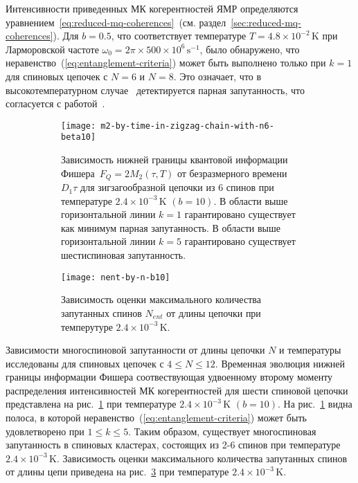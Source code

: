 Интенсивности приведенных МК когерентностей ЯМР определяются уравнением~\ref{eq:reduced-mq-coherences}~(см. раздел~\ref{sec:reduced-mq-coherences}).
Для $b=0.5$,
что соответствует температуре $T=4.8 \times 10^{-2}\,\mbox{K}$
при Ларморовской частоте $\omega_0=2\pi\times 500\times 10^6 \,\mbox{s}^{-1}$,
было обнаружено,
что неравенство~(\ref{eq:entanglement-criteria}) может быть выполнено только при $k=1$ для спиновых цепочек с $N=6$ и $N=8$.
Это означает, что в высокотемпературном случае~\cite{Doronin2019}
детектируется парная запутанность,
что согласуется с работой~\cite{Feldman2012}.

\begin{figure}[H]
  \begin{subfigure}[t]{0.49\textwidth}
    \texttt{[image: m2-by-time-in-zigzag-chain-with-n6-beta10]}
    \caption{
      Зависимость нижней границы квантовой информации
      Фишера~$F_Q=2M_2(\tau, T)$
      от безразмерного времени~$D_1\tau$
      для зигзагообразной цепочки из 6 спинов
      при температуре $2.4\times 10^{-3}\,\mbox{K}$ $(b=10)$.
      В области выше горизонтальной линии $k=1$
      гарантировано существует как минимум парная запутанность.
      В области выше горизонтальной линии $k=5$
      гарантировано существует шестиспиновая запутанность.
    }
    \label{fig:fig3}
  \end{subfigure}
  \hfill
  \begin{subfigure}[t]{0.49\textwidth}
    \texttt{[image: nent-by-n-b10]}
    \caption{
      Зависимость оценки максимального количества запутанных спинов $N_{ent}$ от длины цепочки при темперутуре $2.4\times 10^{-3}\,\mbox{K}$.
    }
    \label{fig:fig4}
  \end{subfigure}
  \caption{}
\end{figure}

Зависимости многоспиновой запутанности от длины цепочки $N$ и температуры исследованы для спиновых цепочек с $4\leqslant N \leqslant 12$.
Временная эволюция нижней границы информации Фишера соотвествующая
удвоенному второму моменту распределения интенсивностей МК когерентностей для шести спиновой цепочки представлена на рис.~\ref{fig:fig3} при температуре $2.4\times 10^{-3}\,\mbox{K}$ $(b=10)$.
На рис.~\ref{fig:fig3} видна полоса,
в которой неравенство~(\ref{eq:entanglement-criteria}) может быть удовлетворено при $1\leqslant k \leqslant 5$.
Таким образом, существует многоспиновая запутанность в спиновых кластерах, состоящих из 2-6 спинов при температуре $2.4\times 10^{-3}\,\mbox{K}$.
Зависимость оценки максимального количества запутанных спинов от длины цепи приведена на рис.~\ref{fig:fig4} при температуре $2.4\times 10^{-3}\,\mbox{K}$.


